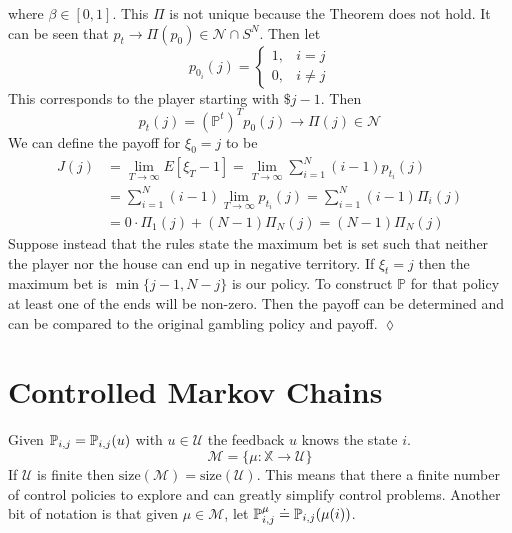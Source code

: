 \begin{example}
where $\beta\in[0,1]$. This $\Pi$ is not unique because the Theorem does not hold. It can be seen that $p_t\rightarrow \Pi(p_0)\in\mathcal{N}\cap S^N$. Then let
$$p_{0_i}(j) = \begin{cases} 1, & i=j \\ 0, & i\neq j \end{cases}$$
This corresponds to the player starting with $\$j-1$. Then
$$p_t(j) = (\mathbb{P}^t)^Tp_0(j) \rightarrow \Pi(j)\in\mathcal{N}$$
We can define the payoff for $\xi_0=j$ to be
\begin{align*}
J(j) &= \lim_{T\to\infty}E[\xi_T-1] = \lim_{T\to\infty}\sum_{i=1}^N (i-1)p_{t_i}(j) \\
&= \sum_{i=1}^N (i-1)\lim_{T\to\infty} p_{t_i}(j) = \sum_{i=1}^N (i-1) \Pi_i(j) \\
&= 0\cdot \Pi_1(j) + (N-1)\Pi_N(j) = (N-1)\Pi_N(j)
\end{align*}
Suppose instead that the rules state the maximum bet is set such that neither the player nor the house can end up in negative territory. If $\xi_t=j$ then the maximum bet is $\min\{j-1,N-j\}$ is our policy. To construct $\mathbb{P}$ for that policy at least one of the ends will be non-zero. Then the payoff can be determined and can be compared to the original gambling policy and payoff.
$\lozenge$
\end{example}

\section{Controlled Markov Chains}
Given $\mathbb{P}_{i,j}=\mathbb{P}_{i,j}(u)$ with $u\in\mathcal{U}$ the feedback $u$ knows the state $i$.
$$\mathcal{M}=\{\mu:\mathbb{X}\rightarrow\mathcal{U}\}$$
If $\mathcal{U}$ is finite then $\text{size}(\mathcal{M})=\text{size}(\mathcal{U})$. This means that there a finite number of control policies to explore and can greatly simplify control problems. Another bit of notation is that given $\mu\in\mathcal{M}$, let $\mathbb{P}_{i,j}^\mu \doteq \mathbb{P}_{i,j}(\mu(i))$.

